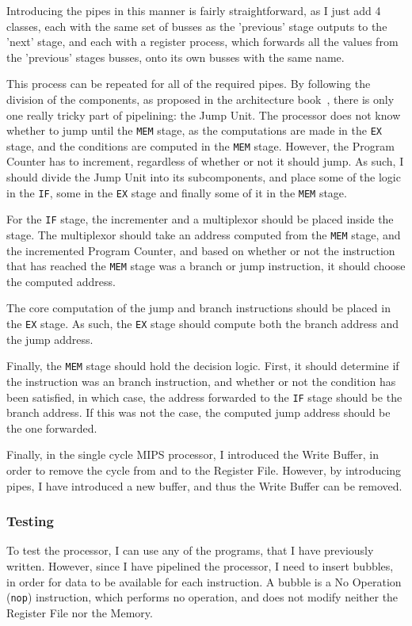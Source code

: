Introducing the pipes in this manner is fairly straightforward, as I just
add 4 classes, each with the same set of busses as the 'previous' stage outputs
to the 'next' stage, and each with a register process, which forwards all the
values from the 'previous' stages busses, onto its own busses with the same
name.

This process can be repeated for all of the required pipes. By following the
division of the components, as proposed in the architecture book~\cite{ref:ark},
there is only one really tricky part of pipelining: the Jump Unit. The
processor does not know whether to jump until the \texttt{MEM} stage, as the
computations are made in the \texttt{EX} stage, and the conditions are computed
in the \texttt{MEM} stage. However, the Program Counter has to increment,
regardless of whether or not it should jump. As such, I should divide the Jump
Unit into its subcomponents, and place some of the logic in the \texttt{IF},
some in the \texttt{EX} stage and finally some of it in the \texttt{MEM} stage.

For the \texttt{IF} stage, the incrementer and a multiplexor should be placed
inside the stage. The multiplexor should take an address computed from the
\texttt{MEM} stage, and the incremented Program Counter, and based on whether
or not the instruction that has reached the \texttt{MEM} stage was a branch or
jump instruction, it should choose the computed address.

The core computation of the jump and branch instructions should be placed in
the \texttt{EX} stage. As such, the \texttt{EX} stage should compute both the
branch address and the jump address.

Finally, the \texttt{MEM} stage should hold the decision logic. First, it
should determine if the instruction was an branch instruction, and whether or
not the condition has been satisfied, in which case, the address forwarded to
the \texttt{IF} stage should be the branch address. If this was not the case,
the computed jump address should be the one forwarded.

Finally, in the single cycle MIPS processor, I introduced the Write Buffer, in
order to remove the cycle from and to the Register File. However, by
introducing pipes, I have introduced a new buffer, and thus the Write Buffer
can be removed.

\subsubsection*{Testing}
To test the processor, I can use any of the programs, that I have previously
written. However, since I have pipelined the processor, I need to insert
bubbles, in order for data to be available for each instruction. A bubble is a
No Operation (\texttt{nop}) instruction, which performs no operation, and does
not modify neither the Register File nor the Memory.


